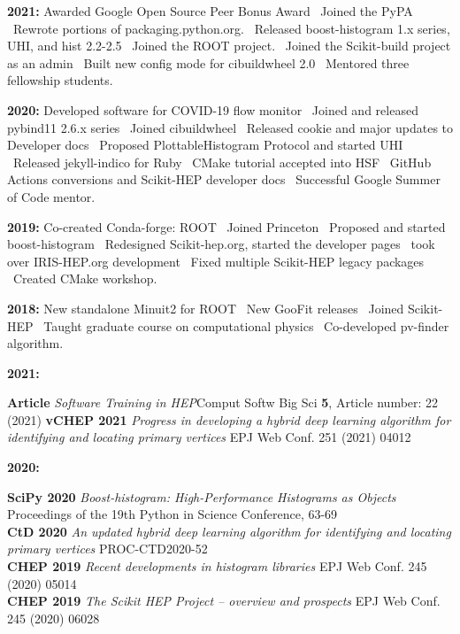 \documentclass[10pt,letterpaper]{moderncv}
\begin{document}

\textbf{2021:} Awarded Google Open Source Peer Bonus Award \textbullet\ Joined the PyPA \textbullet\ Rewrote portions of packaging.python.org. \textbullet\ Released boost-histogram 1.x series, UHI, and hist 2.2-2.5 \textbullet\ Joined the ROOT project. \textbullet\ Joined the Scikit-build project as an admin \textbullet\ Built new config mode for cibuildwheel 2.0 \textbullet\ Mentored three fellowship students.

\textbf{2020:} Developed software for COVID-19 flow monitor \textbullet\ Joined and released pybind11 2.6.x series \textbullet\ Joined cibuildwheel \textbullet\ Released cookie and major updates to Developer docs \textbullet\ Proposed PlottableHistogram Protocol and started UHI \textbullet\ Released jekyll-indico for Ruby \textbullet\ CMake tutorial accepted into HSF \textbullet\ GitHub Actions conversions and Scikit-HEP developer docs \textbullet\ Successful Google Summer of Code mentor.

\textbf{2019:} Co-created Conda-forge: ROOT \textbullet\ Joined Princeton \textbullet\ Proposed and started boost-histogram \textbullet\ Redesigned Scikit-hep.org, started the developer pages \textbullet\ took over IRIS-HEP.org development \textbullet\ Fixed multiple Scikit-HEP legacy packages \textbullet\ Created CMake workshop.

\textbf{2018:} New standalone Minuit2 for ROOT \textbullet\ New GooFit releases \textbullet\ Joined Scikit-HEP \textbullet\ Taught graduate course on computational physics \textbullet\ Co-developed pv-finder algorithm.


\begin{minipage}[t]{.065\textwidth}
\textbf{2021:}
\end{minipage}%
\begin{minipage}[t]{.935\textwidth}
\textbf{Article} \emph{Software Training in HEP}Comput Softw Big Sci \textbf{5}, Article number: 22 (2021)
\textbf{vCHEP 2021} \emph{Progress in developing a hybrid deep learning algorithm for identifying and locating primary vertices} EPJ Web Conf. 251 (2021) 04012
\end{minipage}

\begin{minipage}[t]{.065\textwidth}
\textbf{2020:}
\end{minipage}%
\begin{minipage}[t]{.935\textwidth}
\textbf{SciPy 2020} \emph{Boost-histogram: High-Performance Histograms as Objects} Proceedings of the 19th Python in Science Conference, 63-69 \\
\textbf{CtD 2020}   \emph{An updated hybrid deep learning algorithm for identifying and locating primary vertices} PROC-CTD2020-52 \\
\textbf{CHEP 2019}  \emph{Recent developments in histogram libraries} EPJ Web Conf. 245 (2020) 05014 \\
\textbf{CHEP 2019}  \emph{The Scikit HEP Project -- overview and prospects} EPJ Web Conf. 245 (2020) 06028
\end{minipage}
\end{document}
